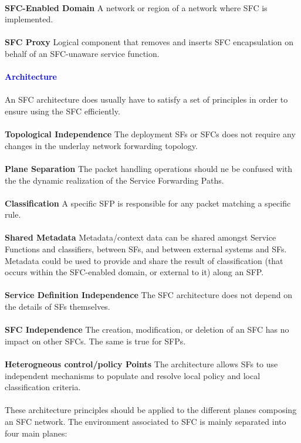 \\
\textbf{SFC-Enabled Domain} A network or region of a network where SFC is implemented.\\
\\
\textbf{SFC Proxy} Logical component that removes and inserts SFC encapsulation on behalf of an     SFC-unaware service function.\\
\\
\textbf{\textcolor{blue}{\Large Architecture}}\\
\\
An SFC architecture does usually have to satisfy a set of principles in order to ensure using the SFC efficiently.\\
\\
\textbf{Topological Independence} 
The deployment SFs or SFCs does not require any changes in the underlay network forwarding topology.\\
\\
\textbf{Plane Separation} The packet handling operations should ne be confused with the the dynamic realization of the Service Forwarding Paths.\\
\\
\textbf{Classification} A specific SFP is responsible for any packet matching a specific rule.\\
\\
\textbf{Shared Metadata} Metadata/context data can be shared amongst Service Functions and classifiers, between SFs, and between external systems and SFs. Metadata could be used to provide and share the result of classification (that occurs within the SFC-enabled domain, or external to it) along an SFP.\\
\\ 
\textbf{Service Definition Independence} The SFC architecture does not depend on the details of SFs themselves.\\
\\
\textbf{SFC Independence} The creation, modification, or deletion of an SFC has no impact on other SFCs. The same is true for SFPs.\\
\\
\textbf{Heterogneous control/policy Points} The architecture allows SFs
to use independent mechanisms to
populate and resolve local policy and  local classification criteria.\\
\\
These architecture principles should be applied to the  different planes composing an SFC network. The environment associated to SFC is mainly separated into four main planes:\\
